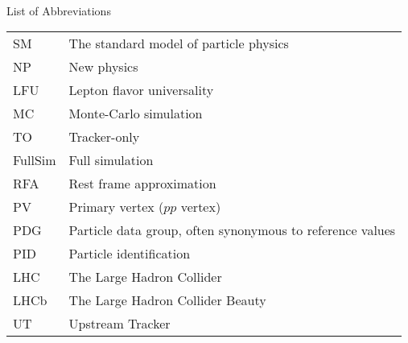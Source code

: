 \singlespacing \normalsize
\hbox{\ }

\vspace{.5in}

\begin{center}
\large{List of Abbreviations}
\end{center}

\vspace{3pt}

\begin{supertabular}{ll}
    SM      & The standard model of particle physics \\
    NP      & New physics \\
    LFU     & Lepton flavor universality \\
    MC      & Monte-Carlo simulation \\
    TO      & Tracker-only \\
    FullSim & Full simulation \\
    RFA     & Rest frame approximation \\
    PV      & Primary vertex ($pp$ vertex) \\
    PDG     & Particle data group, often synonymous to reference values \\
    PID     & Particle identification \\
    LHC     & The Large Hadron Collider \\
    LHCb    & The Large Hadron Collider Beauty \\
    UT      & Upstream Tracker \\
\end{supertabular}
